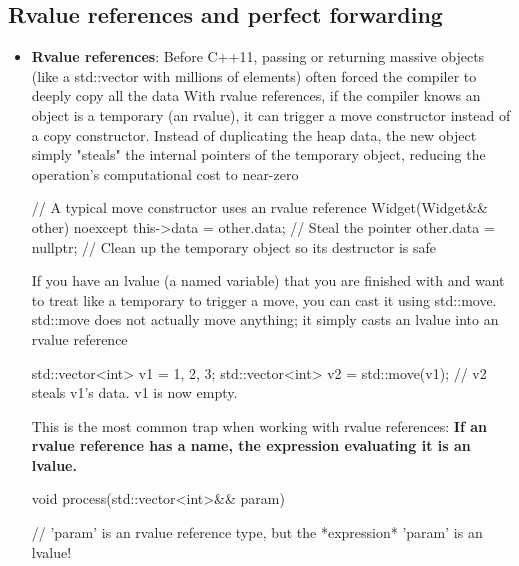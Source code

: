 \documentclass{report}
\begin{document}
    \pagebreak 
    \subsection{Rvalue references and perfect forwarding}
    \begin{itemize}
        \item \textbf{Rvalue references}: Before C++11, passing or returning massive objects (like a std::vector with millions of elements) often forced the compiler to deeply copy all the data
            \bigbreak \noindent 
            With rvalue references, if the compiler knows an object is a temporary (an rvalue), it can trigger a move constructor instead of a copy constructor. Instead of duplicating the heap data, the new object simply "steals" the internal pointers of the temporary object, reducing the operation's computational cost to near-zero
            \bigbreak \noindent 
            \begin{cppcode}
                // A typical move constructor uses an rvalue reference
                Widget(Widget&& other) noexcept {
                    this->data = other.data;  // Steal the pointer
                    other.data = nullptr;     // Clean up the temporary object so its destructor is safe
                }
            \end{cppcode}
            \bigbreak \noindent 
            If you have an lvalue (a named variable) that you are finished with and want to treat like a temporary to trigger a move, you can cast it using std::move. std::move does not actually move anything; it simply casts an lvalue into an rvalue reference
            \bigbreak \noindent 
            \begin{cppcode}
                std::vector<int> v1 = {1, 2, 3};
                std::vector<int> v2 = std::move(v1); // v2 steals v1's data. v1 is now empty.
            \end{cppcode}
            \bigbreak \noindent 
            This is the most common trap when working with rvalue references: \textbf{If an rvalue reference has a name, the expression evaluating it is an lvalue.}
            \bigbreak \noindent 
            \begin{cppcode}
                void process(std::vector<int>&& param) {
                    // 'param' is an rvalue reference type, but the *expression* 'param' is an lvalue!

}
\end{cppcode}
\end{itemize}
\end{document}
